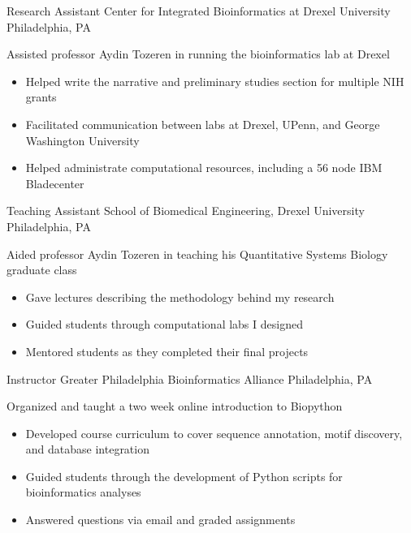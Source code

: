 \documentclass [10pt, letterpaper]{moderncv}
\newcommand\myitem{\item[ $\circ$ ]\hspace*{.1em} }
\begin{document}
         {Research Assistant}
         {Center for Integrated Bioinformatics at Drexel University}
         {Philadelphia, PA}
         {}         
         {Assisted professor Aydin Tozeren in running the
          bioinformatics lab at Drexel
          \begin{itemize}
           \setlength{\itemindent}{1.5em}
\myitem Helped write the narrative and preliminary studies section for multiple NIH grants
\myitem Facilitated communication between labs at Drexel, UPenn, and George Washington University
\myitem Helped administrate computational resources, including a 56 node IBM Bladecenter
\end{itemize}
}

        {Teaching Assistant}
        {School of Biomedical Engineering, Drexel University}
        {Philadelphia, PA}
        {}
        {Aided professor Aydin Tozeren in teaching his Quantitative Systems Biology graduate class
         \begin{itemize}
           \setlength{\itemindent}{1.5em}
          \myitem Gave lectures describing the methodology behind my research
           \myitem Guided students through computational labs I designed
         \myitem Mentored students as they completed their final projects
        \end{itemize}
        }

        {Instructor}
        {Greater Philadelphia Bioinformatics Alliance}
        {Philadelphia, PA} {}
        {Organized and taught a two week online introduction to Biopython
        \begin{itemize}%
          \setlength{\itemindent}{1.5em}
        \myitem Developed course curriculum to cover sequence annotation, motif discovery, and database integration
        \myitem Guided students through the development of Python scripts for bioinformatics analyses
        \myitem Answered questions via email and graded assignments
        \end{itemize} 
        }

\end{document}
